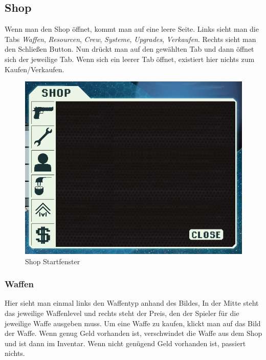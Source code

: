 \documentclass[fontsize=12pt,paper=a4,twoside]{scrartcl}
\begin{document}
\subsection{Shop}
\label{Shop}

Wenn man den Shop öffnet, kommt man auf eine leere Seite. Links sieht man die Tabs \textit{Waffen}, \textit{Resourcen}, \textit{Crew}, \textit{Systeme}, \textit{Upgrades}, \textit{Verkaufen}. Rechts sieht man den Schließen Button. Nun drückt man auf den gewählten Tab und dann öffnet sich der jeweilige Tab. Wenn sich ein leerer Tab öffnet, existiert hier nichts zum Kaufen/Verkaufen. 

\begin{figure}[H]
\centering
\includegraphics[width=1\linewidth]{DasSpiel/Shop/shop.png}
\caption{Shop Startfenster}
\end{figure}

\subsubsection{Waffen}

Hier sieht man einmal links den Waffentyp anhand des Bildes, In der Mitte steht das jeweilige Waffenlevel und rechts steht der Preis, den der Spieler für die jeweilige Waffe ausgeben muss. Um eine Waffe zu kaufen, klickt man auf das Bild der Waffe. Wenn genug Geld vorhanden ist, verschwindet die Waffe aus dem Shop und ist dann im Inventar. Wenn nicht genügend Geld vorhanden ist, passiert nichts. 
\end{document}
